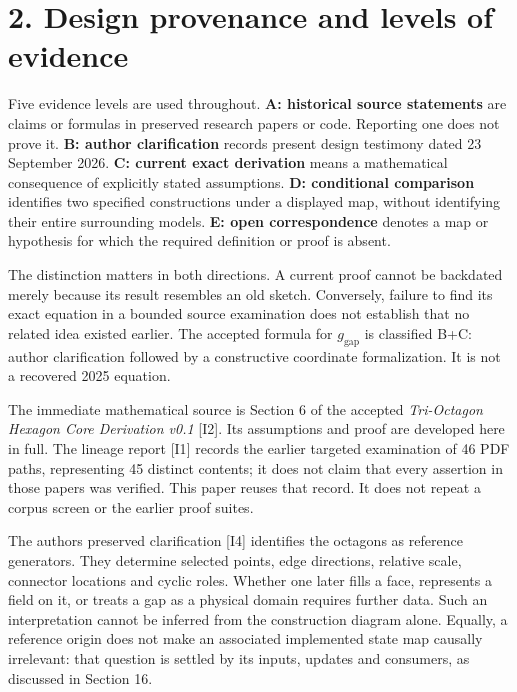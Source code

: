 \documentclass[
  11pt,
  a4paper,
]{article}
\begin{document}
\section{2. Design provenance and levels of evidence}\label{design-provenance-and-levels-of-evidence}

Five evidence levels are used throughout. \textbf{A: historical source statements} are claims or formulas in preserved research papers or code. Reporting one does not prove it. \textbf{B: author clarification} records present design testimony dated 23 September 2026. \textbf{C: current exact derivation} means a mathematical consequence of explicitly stated assumptions. \textbf{D: conditional comparison} identifies two specified constructions under a displayed map, without identifying their entire surrounding models. \textbf{E: open correspondence} denotes a map or hypothesis for which the required definition or proof is absent.

The distinction matters in both directions. A current proof cannot be backdated merely because its result resembles an old sketch. Conversely, failure to find its exact equation in a bounded source examination does not establish that no related idea existed earlier. The accepted formula for \(g_{\mathrm{gap}}\) is classified B+C: author clarification followed by a constructive coordinate formalization. It is not a recovered 2025 equation.

The immediate mathematical source is Section 6 of the accepted \emph{Tri-Octagon Hexagon Core Derivation v0.1} {[}I2{]}. Its assumptions and proof are developed here in full. The lineage report {[}I1{]} records the earlier targeted examination of 46 PDF paths, representing 45 distinct contents; it does not claim that every assertion in those papers was verified. This paper reuses that record. It does not repeat a corpus screen or the earlier proof suites.

The author\textquotesingle s preserved clarification {[}I4{]} identifies the octagons as reference generators. They determine selected points, edge directions, relative scale, connector locations and cyclic roles. Whether one later fills a face, represents a field on it, or treats a gap as a physical domain requires further data. Such an interpretation cannot be inferred from the construction diagram alone. Equally, a reference origin does not make an associated implemented state map causally irrelevant: that question is settled by its inputs, updates and consumers, as discussed in Section 16.
\end{document}
